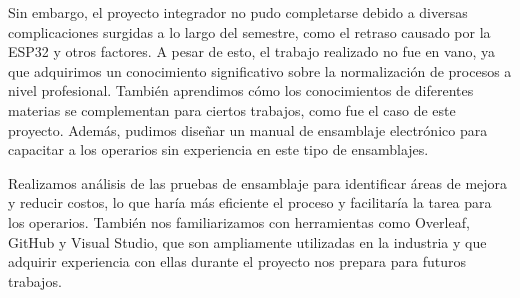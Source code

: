     Sin embargo, el proyecto integrador no pudo completarse debido a diversas complicaciones surgidas a lo largo del semestre, como el retraso causado por la ESP32 y otros factores. A pesar de esto, el trabajo realizado no fue en vano, ya que adquirimos un conocimiento significativo sobre la normalización de procesos a nivel profesional. También aprendimos cómo los conocimientos de diferentes materias se complementan para ciertos trabajos, como fue el caso de este proyecto. Además, pudimos diseñar un manual de ensamblaje electrónico para capacitar a los operarios sin experiencia en este tipo de ensamblajes.
    
    Realizamos análisis de las pruebas de ensamblaje para identificar áreas de mejora y reducir costos, lo que haría más eficiente el proceso y facilitaría la tarea para los operarios. También nos familiarizamos con herramientas como Overleaf, GitHub y Visual Studio, que son ampliamente utilizadas en la industria y que adquirir experiencia con ellas durante el proyecto nos prepara para futuros trabajos.
    
